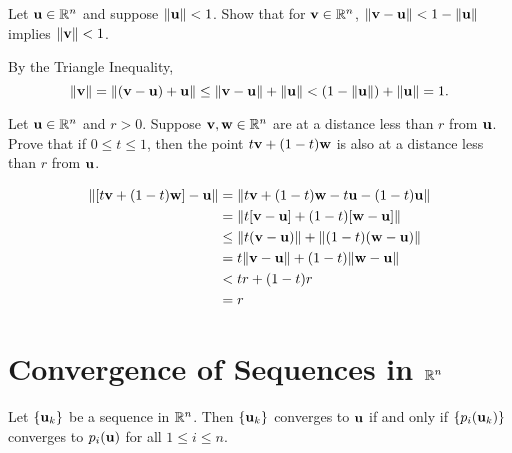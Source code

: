 \documentclass[letterpaper, twoside, 12pt]{book}
\begin{document}
\begin{exercise}[9]
  Let \(\mathbf u\in\mathbb R^n\) and suppose \(\|\mathbf u\|<1\).
  Show that for \(\mathbf v\in\mathbb R^n\),
  \(\|\mathbf v-\mathbf u\|<1-\|\mathbf u\|\) implies
  \(\|\mathbf v\|<1\).
\end{exercise}

\begin{solution}
    By the Triangle Inequality,
    \[ \|\mathbf v\| = \|(\mathbf v - \mathbf u) + \mathbf u \| 
        \leq \|\mathbf v - \mathbf u\| + \|\mathbf u\|
        < (1 - \|\mathbf u\| ) + \|\mathbf u\|
    = 1 .\]
\end{solution}

\begin{exercise}[10]
  Let \(\mathbf u\in\mathbb R^n\) and \(r>0\). Suppose \(\mathbf v,\mathbf w\in\mathbb R^n\)
  are at a distance less than \(r\) from \(\mathbf u\). Prove that if
  \(0\leq t\leq 1\), then the point \(t\mathbf v+(1-t)\mathbf w\) is also
  at a distance less than \(r\) from \(\mathbf u\).
\end{exercise}

\begin{solution}
    \begin{align*} 
        \| [t\mathbf v + (1-t)\mathbf w] - \mathbf u \| &= \| t\mathbf v + (1-t)\mathbf w - t\mathbf u - (1-t) \mathbf u \| \\ 
                        &= \| t[\mathbf v - \mathbf u] + (1-t)[\mathbf w - \mathbf u] \| \\
                        &\leq \| t(\mathbf v - \mathbf u )\| + \|(1 - t)(\mathbf w - \mathbf u) \| \\
                        &= t \|\mathbf v - \mathbf u \| + (1 - t) \| \mathbf w - \mathbf u \| \\
                        &< tr + (1-t)r \\
                        &= r
    \end{align*}
\end{solution}


\section{Convergence of Sequences in \texorpdfstring{$\mathbb R^n$}{Rn}}

\begin{theorem}
  Let \(\{\mathbf u_k\}\) be a sequence in \(\mathbb R^n\). Then
  \(\{\mathbf u_k\}\) converges to \(\mathbf u\) if and only if
  \(\{p_i(\mathbf u_k)\}\) converges to \(p_i(\mathbf u)\) for
  all \(1\leq i\leq n\).
\end{theorem}
\end{document}
